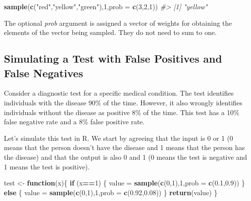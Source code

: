 \documentclass[
]{book}
\newenvironment{Shaded}{\begin{snugshade}}{\end{snugshade}}
\newcommand{\AttributeTok}[1]{\textcolor[rgb]{0.13,0.29,0.53}{#1}}
\newcommand{\CommentTok}[1]{\textcolor[rgb]{0.56,0.35,0.01}{\textit{#1}}}
\newcommand{\ControlFlowTok}[1]{\textcolor[rgb]{0.13,0.29,0.53}{\textbf{#1}}}
\newcommand{\DecValTok}[1]{\textcolor[rgb]{0.00,0.00,0.81}{#1}}
\newcommand{\FloatTok}[1]{\textcolor[rgb]{0.00,0.00,0.81}{#1}}
\newcommand{\FunctionTok}[1]{\textcolor[rgb]{0.13,0.29,0.53}{\textbf{#1}}}
\newcommand{\NormalTok}[1]{#1}
\newcommand{\OtherTok}[1]{\textcolor[rgb]{0.56,0.35,0.01}{#1}}
\newcommand{\SpecialCharTok}[1]{\textcolor[rgb]{0.81,0.36,0.00}{\textbf{#1}}}
\newcommand{\StringTok}[1]{\textcolor[rgb]{0.31,0.60,0.02}{#1}}
\theoremstyle{definition}
\theoremstyle{definition}
\theoremstyle{definition}
\theoremstyle{definition}
\theoremstyle{remark}
\begin{document}
\begin{Shaded}
\begin{Highlighting}[]
\FunctionTok{sample}\NormalTok{(}\FunctionTok{c}\NormalTok{(}\StringTok{"red"}\NormalTok{,}\StringTok{"yellow"}\NormalTok{,}\StringTok{"green"}\NormalTok{),}\DecValTok{1}\NormalTok{,}\AttributeTok{prob =} \FunctionTok{c}\NormalTok{(}\DecValTok{3}\NormalTok{,}\DecValTok{2}\NormalTok{,}\DecValTok{1}\NormalTok{))}
\CommentTok{\#\textgreater{} [1] "yellow"}
\end{Highlighting}
\end{Shaded}

The optional \emph{prob} argument is assigned a vector of weights for obtaining the elements of the vector being sampled. They do not need to sum to one.

\hypertarget{simulating-a-test-with-false-positives-and-false-negatives}{%
\subsection*{Simulating a Test with False Positives and False Negatives}\label{simulating-a-test-with-false-positives-and-false-negatives}}

Consider a diagnostic test for a specific medical condition. The test identifies individuals with the disease 90\% of the time. However, it also wrongly identifies individuals without the disease as positive 8\% of the time. This test has a 10\% false negative rate and a 8\% false positive rate.

Let's simulate this test in R. We start by agreeing that the input is 0 or 1 (0 means that the person doesn't have the disease and 1 means that the person has the disease) and that the output is also 0 and 1 (0 means the test is negative and 1 means the test is positive).

\begin{Shaded}
\begin{Highlighting}[]
\NormalTok{test }\OtherTok{\textless{}{-}} \ControlFlowTok{function}\NormalTok{(x)\{}
  \ControlFlowTok{if}\NormalTok{ (x}\SpecialCharTok{==}\DecValTok{1}\NormalTok{) \{}
\NormalTok{    value }\OtherTok{=} \FunctionTok{sample}\NormalTok{(}\FunctionTok{c}\NormalTok{(}\DecValTok{0}\NormalTok{,}\DecValTok{1}\NormalTok{),}\DecValTok{1}\NormalTok{,}\AttributeTok{prob =} \FunctionTok{c}\NormalTok{(}\FloatTok{0.1}\NormalTok{,}\FloatTok{0.9}\NormalTok{))}
\NormalTok{  \} }\ControlFlowTok{else}\NormalTok{ \{}
\NormalTok{    value }\OtherTok{=} \FunctionTok{sample}\NormalTok{(}\FunctionTok{c}\NormalTok{(}\DecValTok{0}\NormalTok{,}\DecValTok{1}\NormalTok{),}\DecValTok{1}\NormalTok{,}\AttributeTok{prob =} \FunctionTok{c}\NormalTok{(}\FloatTok{0.92}\NormalTok{,}\FloatTok{0.08}\NormalTok{))}
\NormalTok{  \}}
  \FunctionTok{return}\NormalTok{(value)}
\NormalTok{\}}
\end{Highlighting}
\end{Shaded}
\end{document}
